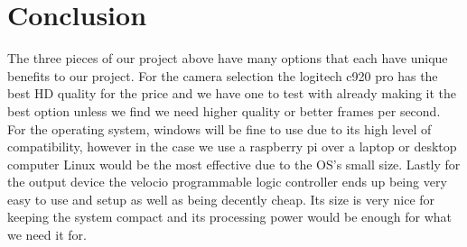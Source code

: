 \documentclass[10pt, letterpaper, twoside, draftclsnofoot, onecolumn. notitlepage]{article}
\begin{document}
\section{Conclusion}
\quad The three pieces of our project above have many options that each have unique benefits to our project. For the camera selection the logitech c920 pro has the best HD quality for the price and we have one to test with already making it the best option unless we find we need higher quality or better frames per second. For the operating system, windows will be fine to use due to its high level of compatibility, however in the case we use a raspberry pi over a laptop or desktop computer Linux would be the most effective due to the OS's small size. Lastly for the output device the velocio programmable logic controller ends up being very easy to use and setup as well as being decently cheap. Its size is very nice for keeping the system compact and its processing power would be enough for what we need it for.

	
\end{document}
